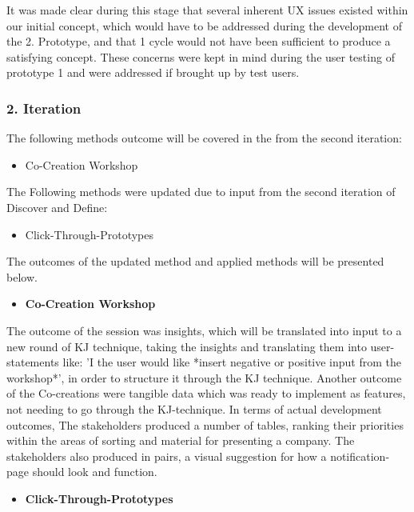 It was made clear during this stage that several inherent UX issues existed within our initial concept, which would have to be addressed during the development of the 2. Prototype, and that 1 cycle would not have been sufficient to produce a satisfying concept. These concerns were kept in mind during the user testing of prototype 1 and were addressed if brought up by test users.


\subsubsection{2. Iteration}

The following methods outcome will be covered in the from the second iteration:

\begin{itemize}
    \item Co-Creation Workshop
\end{itemize}

The Following methods were updated due to input from the second iteration of Discover and Define:

\begin{itemize}
    \item Click-Through-Prototypes
\end{itemize}

The outcomes of the updated method and applied methods will be presented below.

\begin{itemize}
    \item \bf{Co-Creation Workshop}
\end{itemize}

The outcome of the session was insights, which will be translated into input to a new round of KJ technique, taking the insights and translating them into user-statements like: 'I the user would like *insert negative or positive input from the workshop*', in order to structure it through the KJ technique. Another outcome of the Co-creations were tangible data which was ready to implement as features, not needing to go through the KJ-technique. In terms of actual development outcomes, The stakeholders produced a number of tables, ranking their priorities within the areas of sorting and material for presenting a company. The stakeholders also produced in pairs, a visual suggestion for how a notification-page should look and function.

\begin{itemize}
    \item \bf{Click-Through-Prototypes}
\end{itemize}

